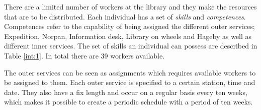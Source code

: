 There are a limited number of workers at the library and they make the resources that are to be distributed. Each individual has a set of \textit{skills} and \textit{competences}. Competences refer to the capability of being assigned the different outer services; Expedition, Norpan, Information desk, Library on wheels and Hageby as well as different inner services. The set of skills an individual can possess are described in Table \ref{int:1}. In total there are 39 workers available.

The outer services can be seen as assignments which requires available workers to be assigned to them. Each outer service is specified to a certain station, time and date. They also have a fix length and occur on a regular basis every ten weeks, which makes it possible to create a periodic schedule with a period of ten weeks. 







